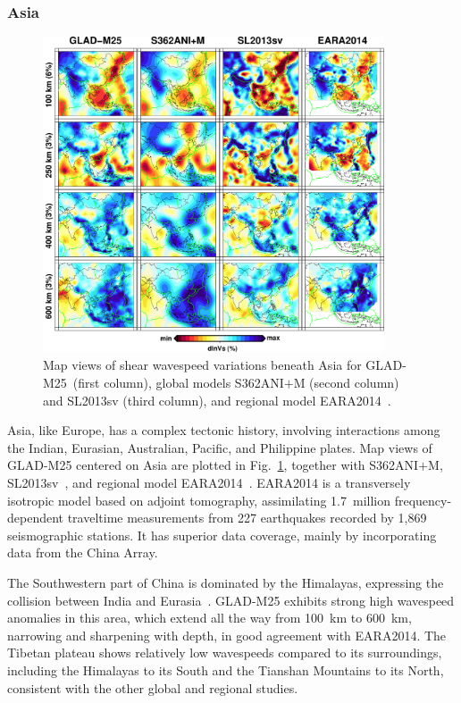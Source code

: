 \documentclass[extra,mreferee]{gji}
\begin{document}
\subsubsection{Asia}

\begin{figure}[ht!]
  \includegraphics[width=0.9\textwidth]{figures/depth_slice/asia_vs.pdf}
  \caption{\small{Map views of shear wavespeed variations beneath Asia for GLAD-M25~(first column),
  global models S362ANI$+$M (second column) and SL2013sv (third column), and regional model EARA2014~\citep[last column;][]{chen2015multiparameter}.}}
  \label{fig:asia-vs}
  \centering
\end{figure}

Asia, like Europe, has a complex tectonic history, involving
interactions among the Indian, Eurasian, Australian, Pacific, and Philippine
plates.
Map views of GLAD-M25 centered on Asia are plotted in Fig.~\ref{fig:asia-vs},
together with S362ANI$+$M, SL2013sv~\citep{SchaefferLebedev13}, and regional model EARA2014~\citep{chen2015multiparameter}.
EARA2014 is a transversely isotropic model based on adjoint
tomography, assimilating 1.7~million frequency-dependent traveltime
measurements from 227 earthquakes recorded by 1,869 seismographic  stations.
It has superior data coverage, mainly by incorporating data from the China Array.

The Southwestern part of China is dominated by the Himalayas,
expressing the collision between India and Eurasia~\citep{lebedev2003upper}.
GLAD-M25 exhibits strong high wavespeed anomalies in this area,
which extend all the way from 100~km to 600~km, narrowing and sharpening with depth,
in good agreement with EARA2014.
The Tibetan plateau shows relatively low wavespeeds
compared to its surroundings, including the Himalayas to its South and
the Tianshan Mountains to its North, consistent with the other global
and regional studies.
\end{document}
